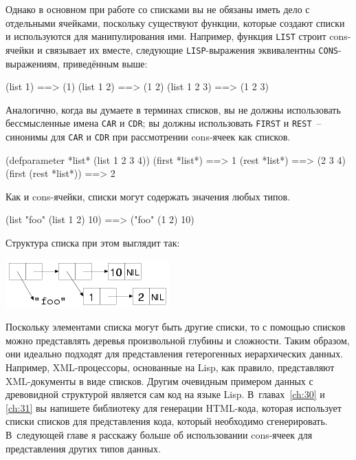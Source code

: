 Однако в основном при работе со списками вы не обязаны иметь дело с отдельными ячейками,
поскольку существуют функции, которые создают списки и используются для манипулирования
ими. Например, функция \lstinline{LIST} строит cons-ячейки и связывает их вместе, следующие
\lstinline{LISP}-выражения эквивалентны \lstinline{CONS}-выражениям, приведённым выше:

\begin{myverb}
(list 1)     ==> (1)
(list 1 2)   ==> (1 2)
(list 1 2 3) ==> (1 2 3)
\end{myverb}

Аналогично, когда вы думаете в терминах списков, вы не должны использовать бессмысленные
имена \lstinline{CAR} и \lstinline{CDR}; вы должны использовать \lstinline{FIRST} и \lstinline{REST}~--
синонимы для \lstinline{CAR} и \lstinline{CDR} при рассмотрении cons-ячеек как списков.

\begin{myverb}
(defparameter *list* (list 1 2 3 4))
(first *list*)        ==> 1
(rest *list*)         ==> (2 3 4)
(first (rest *list*)) ==> 2
\end{myverb}

Как и cons-ячейки, списки могут содержать значения любых типов.

\begin{myverb}
(list "foo" (list 1 2) 10) ==> ("foo" (1 2) 10)
\end{myverb}

Структура списка при этом выглядит так:

\begin{center}
  \includegraphics[scale=0.6]{images/mixed-list.png}
\end{center}

Поскольку элементами списка могут быть другие списки, то с помощью списков можно представлять
деревья произвольной глубины и сложности. Таким образом, они идеально подходят для
представления гетерогенных иерархических данных. Например, XML-процессоры, основанные на
Lisp, как правило, представляют XML-документы в виде списков. Другим очевидным примером
данных с древовидной структурой является сам код на языке Lisp. В~главах~\ref{ch:30} и
\ref{ch:31} вы
напишете библиотеку для генерации HTML-кода, которая использует списки списков для
представления кода, который необходимо сгенерировать. В~следующей главе я расскажу больше
об использовании cons-ячеек для представления других типов данных.

